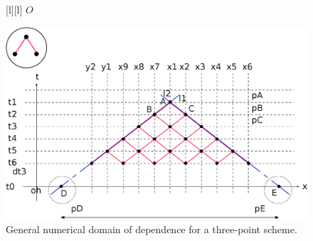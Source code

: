 \begin{figure}[ht]
	[l] {$O$}

	\includegraphics[width=1.0\textwidth]{DomainOfDependenceLF.eps}
	\caption{General numerical domain of dependence for a three-point scheme.}
	\label{\LABEL}
\end{figure}
